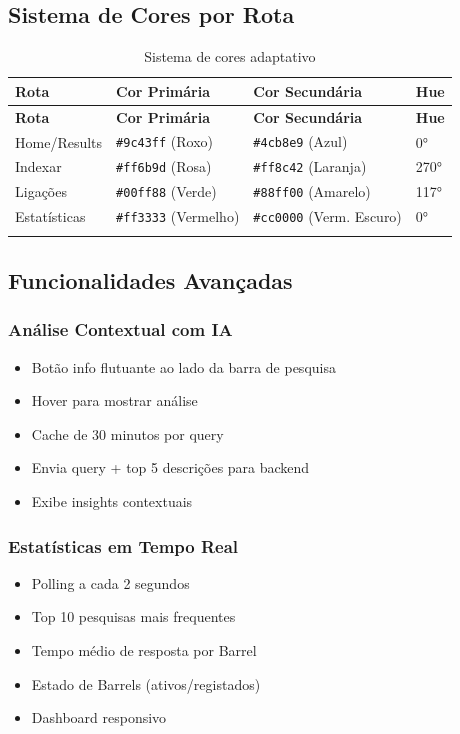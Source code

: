 \documentclass[12pt,a4paper]{article}
\begin{document}
\subsection{Sistema de Cores por Rota}

\begin{longtable}{|p{3.5cm}|p{3cm}|p{3cm}|p{2cm}|}
\hline
\textbf{Rota} & \textbf{Cor Primária} & \textbf{Cor Secundária} & \textbf{Hue} \\
\hline
\endfirsthead
\hline
\textbf{Rota} & \textbf{Cor Primária} & \textbf{Cor Secundária} & \textbf{Hue} \\
\hline
\endhead
\hline
\endfoot

Home/Results & \texttt{\#9c43ff} (Roxo) & \texttt{\#4cb8e9} (Azul) & 0° \\
Indexar & \texttt{\#ff6b9d} (Rosa) & \texttt{\#ff8c42} (Laranja) & 270° \\
Ligações & \texttt{\#00ff88} (Verde) & \texttt{\#88ff00} (Amarelo) & 117° \\
Estatísticas & \texttt{\#ff3333} (Vermelho) & \texttt{\#cc0000} (Verm. Escuro) & 0° \\
\hline
\caption{Sistema de cores adaptativo}
\end{longtable}

\subsection{Funcionalidades Avançadas}

\subsubsection{Análise Contextual com IA}
\begin{itemize}
    \item Botão info flutuante ao lado da barra de pesquisa
    \item Hover para mostrar análise
    \item Cache de 30 minutos por query
    \item Envia query + top 5 descrições para backend
    \item Exibe insights contextuais
\end{itemize}

\subsubsection{Estatísticas em Tempo Real}
\begin{itemize}
    \item Polling a cada 2 segundos
    \item Top 10 pesquisas mais frequentes
    \item Tempo médio de resposta por Barrel
    \item Estado de Barrels (ativos/registados)
    \item Dashboard responsivo
\end{itemize}
\end{document}
